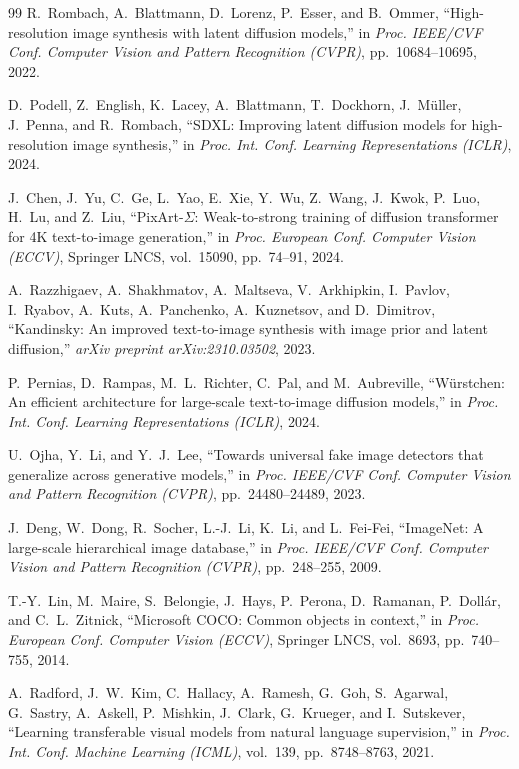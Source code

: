 \begin{thebibliography}{99}
R.~Rombach, A.~Blattmann, D.~Lorenz, P.~Esser, and B.~Ommer,
``High-resolution image synthesis with latent diffusion models,''
in \emph{Proc. IEEE/CVF Conf. Computer Vision and Pattern Recognition
(CVPR)}, pp.\ 10684--10695, 2022.

D.~Podell, Z.~English, K.~Lacey, A.~Blattmann, T.~Dockhorn,
J.~M{\"u}ller, J.~Penna, and R.~Rombach,
``SDXL: Improving latent diffusion models for high-resolution image
synthesis,''
in \emph{Proc. Int. Conf. Learning Representations (ICLR)}, 2024.

J.~Chen, J.~Yu, C.~Ge, L.~Yao, E.~Xie, Y.~Wu, Z.~Wang, J.~Kwok,
P.~Luo, H.~Lu, and Z.~Liu,
``PixArt-$\Sigma$: Weak-to-strong training of diffusion transformer
for 4K text-to-image generation,''
in \emph{Proc. European Conf. Computer Vision (ECCV)},
Springer LNCS, vol.\ 15090, pp.\ 74--91, 2024.

A.~Razzhigaev, A.~Shakhmatov, A.~Maltseva, V.~Arkhipkin,
I.~Pavlov, I.~Ryabov, A.~Kuts, A.~Panchenko, A.~Kuznetsov,
and D.~Dimitrov,
``Kandinsky: An improved text-to-image synthesis with image prior
and latent diffusion,''
\emph{arXiv preprint arXiv:2310.03502}, 2023.

P.~Pernias, D.~Rampas, M.~L.~Richter, C.~Pal, and M.~Aubreville,
``W\"{u}rstchen: An efficient architecture for large-scale
text-to-image diffusion models,''
in \emph{Proc. Int. Conf. Learning Representations (ICLR)}, 2024.

U.~Ojha, Y.~Li, and Y.~J.~Lee,
``Towards universal fake image detectors that generalize across
generative models,''
in \emph{Proc. IEEE/CVF Conf. Computer Vision and Pattern Recognition
(CVPR)}, pp.\ 24480--24489, 2023.

J.~Deng, W.~Dong, R.~Socher, L.-J.~Li, K.~Li, and L.~Fei-Fei,
``ImageNet: A large-scale hierarchical image database,''
in \emph{Proc. IEEE/CVF Conf. Computer Vision and Pattern Recognition
(CVPR)}, pp.\ 248--255, 2009.

T.-Y.~Lin, M.~Maire, S.~Belongie, J.~Hays, P.~Perona, D.~Ramanan,
P.~Doll{\'a}r, and C.~L.~Zitnick,
``Microsoft COCO: Common objects in context,''
in \emph{Proc. European Conf. Computer Vision (ECCV)},
Springer LNCS, vol.\ 8693, pp.\ 740--755, 2014.

A.~Radford, J.~W.~Kim, C.~Hallacy, A.~Ramesh, G.~Goh,
S.~Agarwal, G.~Sastry, A.~Askell, P.~Mishkin, J.~Clark,
G.~Krueger, and I.~Sutskever,
``Learning transferable visual models from natural language
supervision,''
in \emph{Proc. Int. Conf. Machine Learning (ICML)},
vol.\ 139, pp.\ 8748--8763, 2021.


\end{thebibliography}
